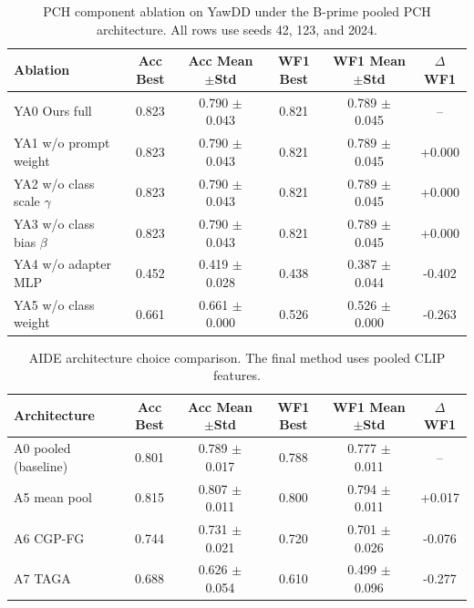 \begin{table}[t]
\centering
\caption{PCH component ablation on YawDD under the B-prime pooled PCH architecture. All rows use seeds 42, 123, and 2024.}
\label{tab:yawdd_ablation}
\begin{tabular}{lccccc}
\toprule
Ablation & Acc Best & Acc Mean$\pm$Std & WF1 Best & WF1 Mean$\pm$Std & $\Delta$WF1 \\
\midrule
YA0 Ours full & 0.823 & 0.790 $\pm$ 0.043 & 0.821 & 0.789 $\pm$ 0.045 & -- \\
YA1 w/o prompt weight & 0.823 & 0.790 $\pm$ 0.043 & 0.821 & 0.789 $\pm$ 0.045 & +0.000 \\
YA2 w/o class scale $\gamma$ & 0.823 & 0.790 $\pm$ 0.043 & 0.821 & 0.789 $\pm$ 0.045 & +0.000 \\
YA3 w/o class bias $\beta$ & 0.823 & 0.790 $\pm$ 0.043 & 0.821 & 0.789 $\pm$ 0.045 & +0.000 \\
YA4 w/o adapter MLP & 0.452 & 0.419 $\pm$ 0.028 & 0.438 & 0.387 $\pm$ 0.044 & -0.402 \\
YA5 w/o class weight & 0.661 & 0.661 $\pm$ 0.000 & 0.526 & 0.526 $\pm$ 0.000 & -0.263 \\
\bottomrule
\end{tabular}
\end{table}

\begin{table}[t]
\centering
\caption{AIDE architecture choice comparison. The final method uses pooled CLIP features.}
\label{tab:arch_choice}
\begin{tabular}{lccccc}
\toprule
Architecture & Acc Best & Acc Mean$\pm$Std & WF1 Best & WF1 Mean$\pm$Std & $\Delta$WF1 \\
\midrule
A0 pooled (baseline) & 0.801 & 0.789 $\pm$ 0.017 & 0.788 & 0.777 $\pm$ 0.011 & -- \\
A5 mean pool & 0.815 & 0.807 $\pm$ 0.011 & 0.800 & 0.794 $\pm$ 0.011 & +0.017 \\
A6 CGP-FG & 0.744 & 0.731 $\pm$ 0.021 & 0.720 & 0.701 $\pm$ 0.026 & -0.076 \\
A7 TAGA & 0.688 & 0.626 $\pm$ 0.054 & 0.610 & 0.499 $\pm$ 0.096 & -0.277 \\
\bottomrule
\end{tabular}
\end{table}


